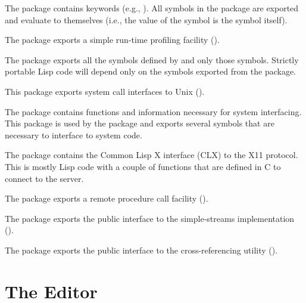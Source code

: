 \begin{Lentry}
\item[\code{keyword}] The  package contains keywords
  (e.g., ).  All symbols in the  package are
  exported and evaluate to themselves (i.e., the value of the symbol
  is the symbol itself).
  
\item[\code{profile}] The  package exports a simple
  run-time profiling facility ().
  
\item[\code{common-lisp (cl)}] The  package
  exports all the symbols defined by \cltl{} and only those symbols.
  Strictly portable Lisp code will depend only on the symbols exported
  from the  package.
  
\item[\code{unix}] This package exports system call
  interfaces to Unix ().
  
\item[\code{system (sys)}] The  package contains
  functions and information necessary for system interfacing.  This
  package is used by the  package and exports several
  symbols that are necessary to interface to system code.
  
\item[\code{xlib}] The  package contains the Common Lisp X
  interface (CLX) to the X11 protocol.  This is mostly Lisp code with
  a couple of functions that are defined in C to connect to the
  server.
  
\item[\code{wire}] The  package exports a remote procedure
  call facility ().

\item[\code{stream}] The  package exports the public
  interface to the simple-streams implementation ().

\item[\code{xref}] The  package exports the public
  interface to the cross-referencing utility ().

\end{Lentry}








\section{The Editor}

